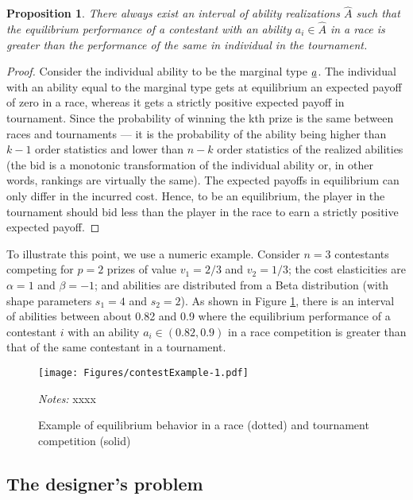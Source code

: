 \documentclass[11pt, titlepage]{article}
\newtheorem{proposition}{Proposition}
\begin{document}
\begin{proposition}
There always exist an interval of ability realizations $\hat A$ such that the equilibrium performance of a contestant with an ability $a_i\in \hat A$ in a race is greater than the performance of the same in  individual in the tournament.
\end{proposition}

\begin{proof}
Consider the individual ability to be the marginal type $\underline{a}$. The individual with an ability equal to the marginal type gets at equilibrium an expected payoff of zero in a race, whereas it gets a strictly positive expected payoff in tournament. Since the probability of winning the kth prize is the same between races and tournaments --- it is the probability of the ability being higher than $k-1$ order statistics and lower than $n-k$ order statistics of the realized abilities (the bid is a monotonic transformation of the individual ability or, in other words, rankings are virtually the same). The expected payoffs in equilibrium can only differ in the incurred cost. Hence, to be an equilibrium, the player in the tournament should bid less than the player in the race to earn a strictly positive expected payoff. 
\end{proof}

To illustrate this point, we use a numeric example. Consider \(n=3\)
contestants competing for \(p=2\) prizes of value \(v_1=2/3\) and
\(v_2=1/3\); the cost elasticities are \(\alpha=1\) and \(\beta=-1\);
and abilities are distributed from a Beta distribution (with shape
parameters \(s_1=4\) and \(s_2=2\)). As shown in Figure
\ref{example contest}, there is an interval of abilities between about
0.82 and 0.9 where the equilibrium performance of a contestant \(i\)
with an ability \(a_i\in (0.82,0.9)\) in a race competition is greater
than that of the same contestant in a tournament.

\begin{figure}
\centering
\caption{Example of equilibrium behavior in a race (dotted) and tournament competition (solid)}
\label{example contest}
\texttt{[image: Figures/contestExample-1.pdf]}
\begin{minipage}{\textwidth}
\footnotesize\emph{Notes:} xxxx
\end{minipage}
\end{figure}

\subsection{The designer's problem}\label{the-designers-problem}
\end{document}
